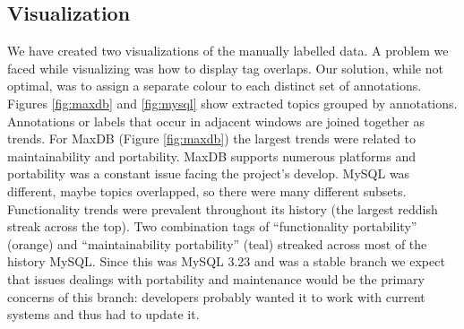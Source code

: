 \documentclass{acm_proc_article-sp}
\begin{document}

\subsection{Visualization}

We have created two visualizations of the manually labelled data. A problem we faced while visualizing was how to display tag overlaps. Our solution, while not optimal, was to assign a separate colour to each distinct set of annotations. Figures \ref{fig:maxdb} and \ref{fig:mysql} show extracted topics grouped by annotations. Annotations or labels that occur in adjacent windows are joined together as trends. For MaxDB (Figure \ref{fig:maxdb}) the largest trends were related to maintainability and portability. MaxDB supports numerous platforms and portability was a constant issue facing the project's develop. MySQL was different, maybe topics overlapped, so there were many different subsets. Functionality trends were prevalent throughout its history (the largest reddish streak across the top). Two combination  tags of ``functionality portability'' (orange) and ``maintainability portability'' (teal) streaked across most of the history MySQL. Since this was MySQL 3.23 and was a stable branch we expect that issues dealings with portability and maintenance would be the primary concerns of this branch: developers probably wanted it to work with current systems and thus had to update it.
\end{document}
